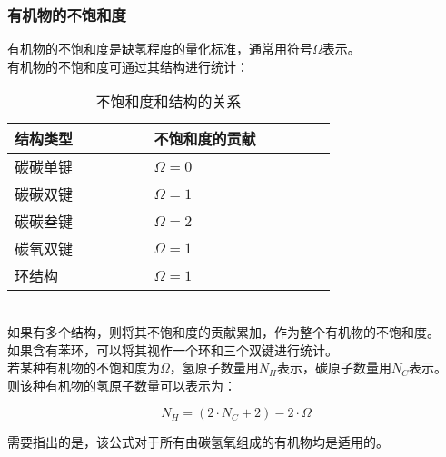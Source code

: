 \documentclass[UTF8]{ctexart}
\begin{document}
\subsubsection{有机物的不饱和度}
    有机物的不饱和度是缺氢程度的量化标准，通常用符号$\Omega$表示。\\[3mm]
    有机物的不饱和度可通过其结构进行统计：\vspace{5pt}
    \begin{table}[h]
        \begin{center}
            \begin{tabular}{l|l}
                \hline
                结构类型~~~~~~~~&不饱和度的贡献~~~~~~~~\\ \hline
                碳碳单键&$\Omega=0$\\ \hline
                碳碳双键&$\Omega=1$\\ \hline
                碳碳叁键&$\Omega=2$\\ \hline
                碳氧双键&$\Omega=1$\\ \hline
                环结构&$\Omega=1$\\ \hline
            \end{tabular}
            \caption{不饱和度和结构的关系}
        \end{center}
    \end{table}\\
    如果有多个结构，则将其不饱和度的贡献累加，作为整个有机物的不饱和度。\\[3mm]
    如果含有苯环，可以将其视作一个环和三个双键进行统计。\\[6mm]
    若某种有机物的不饱和度为$\Omega$，氢原子数量用$N_{H}$表示，碳原子数量用$N_{C}$表示。\\[3mm]
    则该种有机物的氢原子数量可以表示为：
    \begin{large}
        \begin{equation*}
            N_H=(2\cdot N_C+2)-2\cdot\Omega
        \end{equation*}
    \end{large}
    需要指出的是，该公式对于所有由碳氢氧组成的有机物均是适用的。


\newpage
\end{document}
